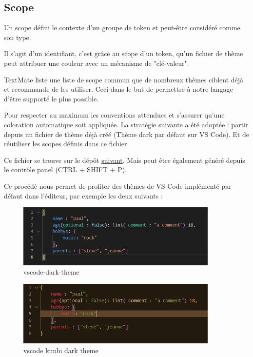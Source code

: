 \documentclass[
    iict, %
    il, %
]{heig-tb}
\begin{document}
\subsection{Scope}
Un scope défini le contexte d'un groupe de token et peut-être considéré comme son type.

Il s'agit d'un identifiant, c'est grâce au scope d'un token, qu'un fichier de thème peut attribuer une couleur avec un mécanisme de "clé-valeur".

TextMate liste une liste de scope commun que de nombreux thèmes ciblent déjà et recommande de les utiliser.
Ceci dans le but de permettre à notre langage d'être supporté le plus possible.

Pour respecter au maximum les conventions attendues et s'assurer qu'une coloration automatique soit appliquée. La stratégie suivante a été adoptée : partir depuis un fichier de thème déjà créé (Thème dark par défaut sur VS Code). 
Et de réutiliser les scopes définis dans ce fichier.

Ce fichier se trouve sur le dépôt \href{https://github.com/microsoft/vscode/blob/main/extensions/theme-defaults/themes/dark_vs.json}{suivant}.
Mais peut être également généré depuis le contrôle panel (CTRL + SHIFT + P).

Ce procédé nous permet de profiter des thèmes de VS Code implémenté par défaut dans l'éditeur, par exemple les deux suivants :

\begin{figure}[!h]
    \begin{center}
        \includegraphics[width=10cm]{assets/figures/vscode-dark-theme.PNG}
    \end{center}
    \caption[vscode dark theme]{\label{vscode-dark-theme} vscode-dark-theme}
\end{figure}


\begin{figure}[!h]
    \begin{center}
        \includegraphics[width=10cm]{assets/figures/vscode-kimbi-dark-theme.PNG}
    \end{center}
    \caption[vscode kimbi dark theme]{\label{vscode-kimbi-dark-theme} vscode kimbi dark theme}
\end{figure}
\end{document}
